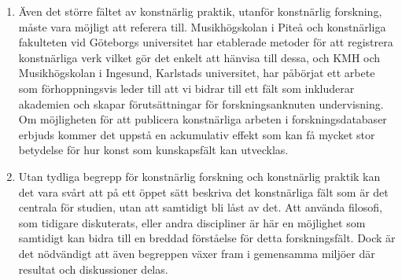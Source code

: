 \documentclass[11pt]{article}
\begin{document}
\begin{enumerate}
\begin{quote}
[\ldots{}] former för kunskapsbyggande i konstnärlig forskning som är
baserat på konstnärlig kunskap. Även teoretiskt drivna resonemang
kan här ta sin utgångspunkt i den konstnärliga praktiken varför
själva praktiken är central i seminarier och labsessioner. De
gemensamma seminarier som vi planerar i Piteå och Stockholm ska ta
formen av ett laboratorium som alla gemensamt ska bidra till den
fortsatta utvecklingen av detta format. En viktig förutsättning är
att skapa ett arbetsklimat som bygger på förtroende av samma slag
som uppstår i konstnärliga samarbeten, och som därigenom skapar
förutsättningar för en kritisk dialog som kan gå på djupet in i
konstnärliga processer.\footnote{\footcite{frisk2018:irl}.}
\end{quote}

Idén är att sätta den konstnärliga praktiken i centrum i en skyddad
seminariemiljö som erbjuder möjligheten att experimentera. I detta
initiativ hoppas vi att det ska bli möjligt att i större utsträckning
begreppsliggöra praktiken och undersökningen vilket samtidigt kan
underlätta att arbetena också diskuteras, kritsikt granskas av
jämlikar, samt att resultaten, såväl som metod och teori, delas.

\item Även det större fältet av konstnärlig praktik, utanför konstnärlig
forskning, måste vara möjligt att referera till. Musikhögskolan i
Piteå och konstnärliga fakulteten vid Göteborgs universitet har
etablerade metoder för att registrera konstnärliga verk vilket gör
det enkelt att hänvisa till dessa, och KMH och Musikhögskolan i
Ingesund, Karlstads universitet, har påbörjat ett arbete som
förhoppningsvis leder till att vi bidrar till ett fält som inkluderar
akademien och skapar förutsättningar för forskningsanknuten
undervisning. Om möjligheten för att publicera konstnärliga arbeten i
forskningsdatabaser erbjuds kommer det uppstå en ackumulativ effekt
som kan få mycket stor betydelse för hur konst som kunskapsfält kan
utvecklas.

\item Utan tydliga begrepp för konstnärlig forskning och konstnärlig
praktik kan det vara svårt att på ett öppet sätt beskriva det
konstnärliga fält som är det centrala för studien, utan att samtidigt
bli låst av det. Att använda filosofi, som tidigare diskuterats,
eller andra discipliner är här en möjlighet som samtidigt kan bidra
till en breddad förståelse för detta forskningsfält. Dock är det
nödvändigt att även begreppen växer fram i gemensamma miljöer där
resultat och diskussioner delas.
\end{enumerate}
\end{document}
